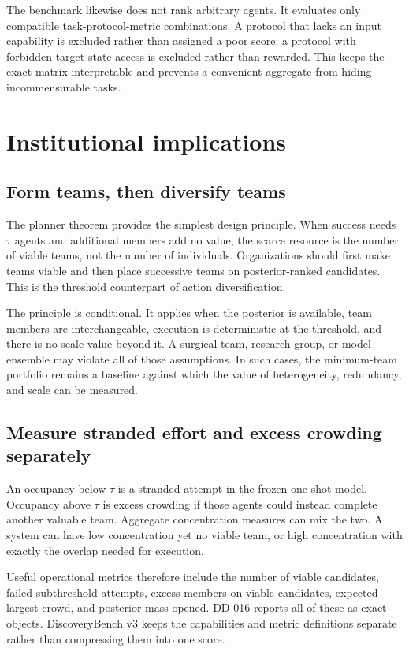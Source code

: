 \documentclass[11pt]{article}
\begin{document}
The benchmark likewise does not rank arbitrary agents. It evaluates only
compatible task-protocol-metric combinations. A protocol that lacks an input
capability is excluded rather than assigned a poor score; a protocol with
forbidden target-state access is excluded rather than rewarded. This keeps the
exact matrix interpretable and prevents a convenient aggregate from hiding
incommensurable tasks.

\section{Institutional implications}

\subsection{Form teams, then diversify teams}

The planner theorem provides the simplest design principle. When success needs
$\tau$ agents and additional members add no value, the scarce resource is the
number of viable teams, not the number of individuals. Organizations should
first make teams viable and then place successive teams on posterior-ranked
candidates. This is the threshold counterpart of action diversification.

The principle is conditional. It applies when the posterior is available, team
members are interchangeable, execution is deterministic at the threshold, and
there is no scale value beyond it. A surgical team, research group, or model
ensemble may violate all of those assumptions. In such cases, the minimum-team
portfolio remains a baseline against which the value of heterogeneity,
redundancy, and scale can be measured.

\subsection{Measure stranded effort and excess crowding separately}

An occupancy below $\tau$ is a stranded attempt in the frozen one-shot model.
Occupancy above $\tau$ is excess crowding if those agents could instead complete
another valuable team. Aggregate concentration measures can mix the two. A
system can have low concentration yet no viable team, or high concentration
with exactly the overlap needed for execution.

Useful operational metrics therefore include the number of viable candidates,
failed subthreshold attempts, excess members on viable candidates, expected
largest crowd, and posterior mass opened. DD-016 reports all of these as exact
objects. DiscoveryBench v3 keeps the capabilities and metric definitions
separate rather than compressing them into one score.
\end{document}
